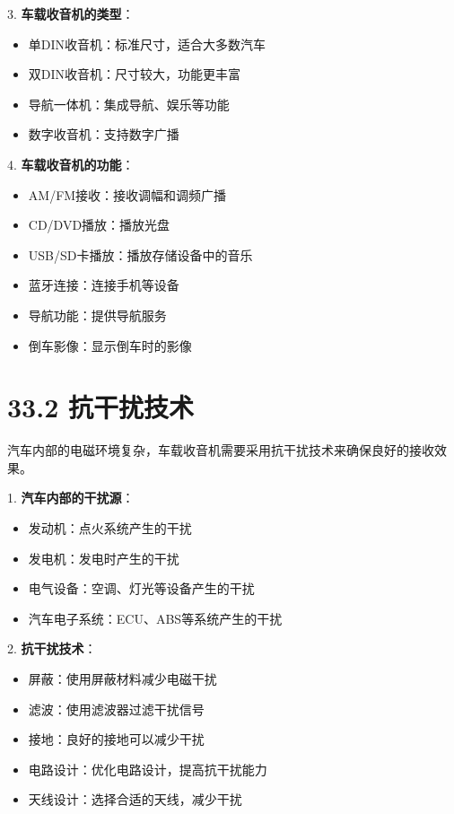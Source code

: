 \documentclass[12pt,UTF8]{ctexbook}
\begin{document}
3. \textbf{车载收音机的类型}：
   \begin{itemize}[leftmargin=3.5em]
   \item 单DIN收音机：标准尺寸，适合大多数汽车
   \item 双DIN收音机：尺寸较大，功能更丰富
   \item 导航一体机：集成导航、娱乐等功能
   \item 数字收音机：支持数字广播
   \end{itemize}

4. \textbf{车载收音机的功能}：
   \begin{itemize}[leftmargin=3.5em]
   \item AM/FM接收：接收调幅和调频广播
   \item CD/DVD播放：播放光盘
   \item USB/SD卡播放：播放存储设备中的音乐
   \item 蓝牙连接：连接手机等设备
   \item 导航功能：提供导航服务
   \item 倒车影像：显示倒车时的影像
   \end{itemize}

\section*{33.2 抗干扰技术}

汽车内部的电磁环境复杂，车载收音机需要采用抗干扰技术来确保良好的接收效果。

1. \textbf{汽车内部的干扰源}：
   \begin{itemize}[leftmargin=3.5em]
   \item 发动机：点火系统产生的干扰
   \item 发电机：发电时产生的干扰
   \item 电气设备：空调、灯光等设备产生的干扰
   \item 汽车电子系统：ECU、ABS等系统产生的干扰
   \end{itemize}

2. \textbf{抗干扰技术}：
   \begin{itemize}[leftmargin=3.5em]
   \item 屏蔽：使用屏蔽材料减少电磁干扰
   \item 滤波：使用滤波器过滤干扰信号
   \item 接地：良好的接地可以减少干扰
   \item 电路设计：优化电路设计，提高抗干扰能力
   \item 天线设计：选择合适的天线，减少干扰
   \end{itemize}
\end{document}
